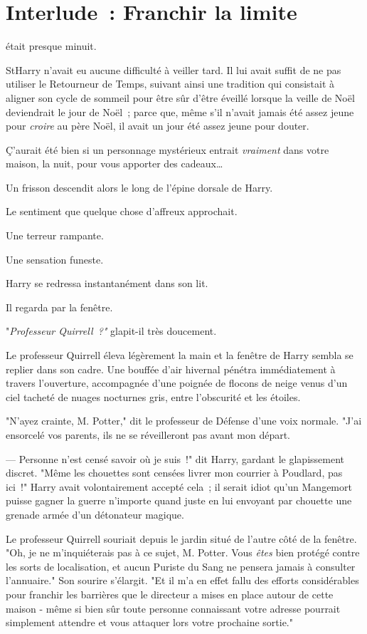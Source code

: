 \chapter{Interlude~: Franchir la limite}

 était presque minuit.

\hplettrineextrapara
StHarry n'avait eu aucune difficulté à veiller tard. Il lui avait suffit de ne pas utiliser le Retourneur de Temps, suivant ainsi une tradition qui consistait à aligner son cycle de sommeil pour être sûr d'être éveillé lorsque la veille de Noël deviendrait le jour de Noël~; parce que, même s'il n'avait jamais été assez jeune pour \emph{croire} au père Noël, il avait un jour été assez jeune pour douter.

Ç'aurait été bien si un personnage mystérieux entrait \emph{vraiment} dans votre maison, la nuit, pour vous apporter des cadeaux…

Un frisson descendit alors le long de l'épine dorsale de Harry.

Le sentiment que quelque chose d'affreux approchait.

Une terreur rampante.

Une sensation funeste.

Harry se redressa instantanément dans son lit.

Il regarda par la fenêtre.

"\emph{Professeur Quirrell~?"} glapit-il très doucement.

Le professeur Quirrell éleva légèrement la main et la fenêtre de Harry sembla se replier dans son cadre. Une bouffée d'air hivernal pénétra immédiatement à travers l'ouverture, accompagnée d'une poignée de flocons de neige venus d'un ciel tacheté de nuages nocturnes gris, entre l'obscurité et les étoiles.

"N'ayez crainte, M. Potter," dit le professeur de Défense d'une voix normale. "J'ai ensorcelé vos parents, ils ne se réveilleront pas avant mon départ.

--- Personne n'est censé savoir où je suis~!" dit Harry, gardant le glapissement discret. "Même les chouettes sont censées livrer mon courrier à Poudlard, pas ici~!" Harry avait volontairement accepté cela~; il serait idiot qu'un Mangemort puisse gagner la guerre n'importe quand juste en lui envoyant par chouette une grenade armée d'un détonateur magique.

Le professeur Quirrell souriait depuis le jardin situé de l'autre côté de la fenêtre. "Oh, je ne m'inquiéterais pas à ce sujet, M. Potter. Vous \emph{êtes} bien protégé contre les sorts de localisation, et aucun Puriste du Sang ne pensera jamais à consulter l'annuaire." Son sourire s'élargit. "Et il m'a en effet fallu des efforts considérables pour franchir les barrières que le directeur a mises en place autour de cette maison - même si bien sûr toute personne connaissant votre adresse pourrait simplement attendre et vous attaquer lors votre prochaine sortie."

